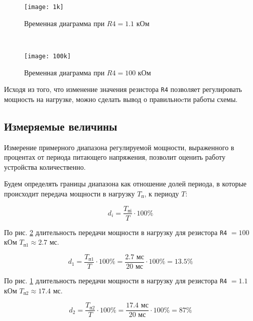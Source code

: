 \begin{figure}[H]
\begin{center}
	\texttt{[image: 1k]}
	\caption{Временная диаграмма при $R4 = 1.1$ кОм}
	\label{pic:diag:1k}
\end{center}
\end{figure}

~

\begin{figure}[H]
\begin{center}
	\texttt{[image: 100k]}
	\caption{Временная диаграмма при $R4 = 100$ кОм}
	\label{pic:diag:100k}
\end{center}
\end{figure}

Исходя из того, что изменение значения резистора \verb+R4+ позволяет регулировать мощность на нагрузке, можно сделать вывод о правильноcти работы схемы.

\subsection{Измеряемые величины}

Измерение примерного диапазона регулируемой мощности, выраженного в процентах от периода питающего напряжения, позволит оценить работу устройства количественно.

Будем определять границы диапазона как отношение долей периода, в которые происходит передача мощности в нагрузку $T_\text{п}$, к периоду $T$:

\begin{equation}
	d_i = \frac{T_\text{пi}}{T} \cdot 100\%
\end{equation}

По рис. \ref{pic:diag:100k} длительность передачи мощности в нагрузку для резистора \verb+R4+ $=100$ кОм $T_\text{п1} \approx 2.7$ мс.

\begin{displaymath}
	d_1 = \frac{T_\text{п1}}{T} \cdot 100\% = \frac{2.7 \text{ мс}}{20\text{ мс}} \cdot 100\% = 13.5 \%
\end{displaymath}

По рис. \ref{pic:diag:1k} длительность передачи мощности в нагрузку для резистора \verb+R4+ $=1.1$ кОм $T_\text{п2} \approx 17.4$ мс.

\begin{displaymath}
	d_2 = \frac{T_\text{п2}}{T} \cdot 100\% = \frac{17.4 \text{ мс}}{20\text{ мс}} \cdot 100\% = 87 \%
\end{displaymath}

